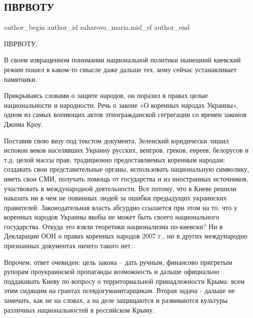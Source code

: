  
 
 
 
 
 
\subsection{ПВРВОТУ}
\label{sec:24_08_2021.fb.zaharova_maria.mid_rf.1.pvrvotu}
 
\ifcmt
 author_begin
   author_id zaharova_maria.mid_rf
 author_end
\fi

ПВРВОТУ.

В своем извращенном понимании национальной политики нынешний киевский режим
пошел в каком-то смысле даже дальше тех, кому сейчас устанавливает памятники.

Прикрываясь словами о защите народов, он поразил в правах целые национальности
и народности. Речь о законе «О коренных народах Украины», одном из самых
вопиющих актов этногражданской сегрегации со времен законов Джима Кроу.

Поставив свою визу под текстом документа, Зеленский юридически лишил испокон
веков населявших Украину русских, венгров, греков, евреев, белорусов и т.д.
целой массы прав, традиционно предоставляемых коренным народам: создавать свои
представительные органы, использовать национальную символику, иметь свои СМИ,
получать помощь от государства и из иностранных источников, участвовать в
международной деятельности. Все потому, что в Киеве решили наказать ни в чем не
повинных людей за ошибки предыдущих украинских правителей. Законодательная
власть абсурдно ссылается при этом на то, что у коренных народов Украины якобы
не может быть своего национального государства. Откуда это взяли теоретики
национализма по-киевски? Ни в Декларации ООН о правах коренных народов 2007 г.,
ни в других международно признанных документах ничего такого нет.

Впрочем, ответ очевиден: цель закона – дать ручным, финансово пригретым рупорам
проукраинской пропаганды возможность и дальше официально поддакивать Киеву по
вопросу о территориальной принадлежности Крыма: всем этим сидящим на грантах
псевдогуманитарщикам. Вторая задача - дальше не замечать, как не на словах, а
на деле защищаются и развиваются культуры различных национальностей в
российском Крыму. 

